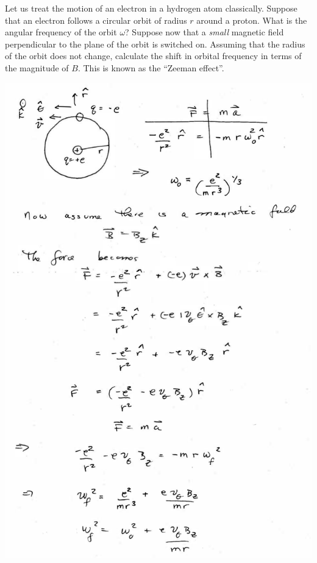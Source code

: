 \documentclass{esg8022pset}
\begin{document}
\begin{problem}{}
  Let us treat the motion of an electron in a hydrogen atom classically. Suppose that an electron follows a circular orbit of radius $r$ around a proton. What is the angular frequency of the orbit $\omega$? Suppose now that a \emph{small} magnetic field perpendicular to the plane of the orbit is switched on. Assuming that the radius of the orbit does not change, calculate the shift in orbital frequency in terms of the magnitude of $B$. This is known as the ``Zeeman effect''.
\end{problem}
\begin{solution}
  \begin{center}\includegraphics[width=\textwidth]{ps07_sol_02_1.pdf}\end{center}

\end{solution}
\end{document}
